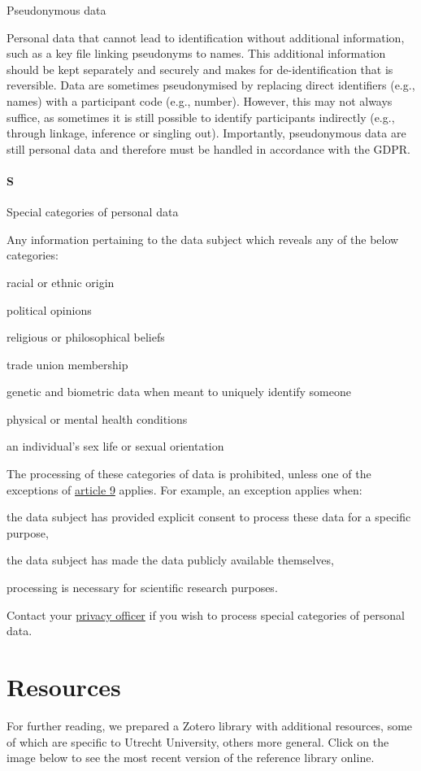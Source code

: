 \documentclass[
]{book}
\begin{document}
Pseudonymous data

Personal data that cannot lead to identification without additional
information, such as a key file linking pseudonyms to names. This additional
information should be kept separately and securely and makes for
de-identification that is reversible. Data are sometimes pseudonymised by
replacing direct identifiers (e.g., names) with a participant code (e.g.,
number). However, this may not always suffice, as sometimes it is still
possible to identify participants indirectly (e.g., through linkage, inference
or singling out). Importantly, pseudonymous data are still personal data and
therefore must be handled in accordance with the GDPR.

\hypertarget{s}{%
\subsubsection{S}\label{s}}

Special categories of personal data

Any information pertaining to the data subject which reveals any of the below categories:

racial or ethnic origin

political opinions

religious or philosophical beliefs

trade union membership

genetic and biometric data when meant to uniquely identify someone

physical or mental health conditions

an individual's sex life or sexual orientation

The processing of these categories of data is prohibited, unless one of
the exceptions of \href{https://gdpr-info.eu/art-9-gdpr/}{article 9}
applies. For example, an exception applies when:

the data subject has provided explicit consent to process these data for
a specific purpose,

the data subject has made the data publicly available themselves,

processing is necessary for scientific research purposes.

Contact your \protect\hyperlink{support}{privacy officer} if you wish to process special categories of personal data.

\hypertarget{references}{%
\chapter{Resources}\label{references}}

For further reading, we prepared a Zotero library with additional resources, some
of which are specific to Utrecht University, others more general. Click on the
image below to see the most recent version of the reference library online.

  
\end{document}
